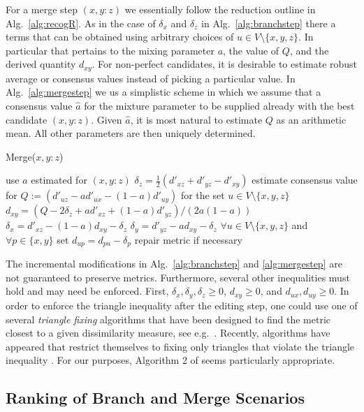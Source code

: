 \documentclass[amsmath]{lni}
\begin{document}
For a merge step $(x,y:z)$ we essentially follow the reduction outline in
Alg.~\ref{alg:recogR}. As in the case of $\delta_x$ and $\delta_z$ in
Alg.~\ref{alg:branchstep} there a terms that can be obtained using
arbitrary choices of $u\in V\setminus\{x,y,z\}$. In particular that
pertains to the mixing parameter $a$, the value of $Q$, and the derived
quantity $d_{xy}$. For non-perfect candidates, it is desirable to estimate
robust average or consensus values instead of picking a particular value.
In Alg.~\ref{alg:mergestep} we us a simplistic scheme in which we assume
that a consensus value $\hat a$ for the mixture parameter to be supplied
already with the best candidate $(x,y:z)$. Given $\hat a$, it is most
natural to estimate $Q$ as an arithmetic mean. All other parameters are
then uniquely determined.

\begin{algorithm}[H]
\caption{Merge($x,y:z$)} 
\label{alg:mergestep} 
\SetAlgoLined
use $a$ estimated for $(x,y:z)$\;
$\delta_z = \frac{1}{2}(d'_{xz}+d'_{yz}-d'_{xy})$\;
estimate consensus value for $Q:=(d'_{uz}-a d'_{ux}-(1-a) d'_{uy})$ for the 
set $u\in V\setminus\{x,y,z\}$\;
$d_{xy} = (Q-2 \delta_z + a d'_{xz}+(1-a) d'_{yz})/(2a(1-a))$\;
$\delta_x = d'_{xz} - (1-a) d_{xy} - \delta_z$\;
$\delta_y = d'_{yz} -   a   d_{xy} - \delta_z$\;
$\forall u\in V\setminus\{x,y,z\}$ and $\forall p\in\{x,y\}$ set   
$d_{up} = d_{pu} -\delta_p$\;
repair metric if necessary\;
\end{algorithm} 

The incremental modifications in Alg.~\ref{alg:branchstep} and
\ref{alg:mergestep} are not guaranteed to preserve metrics. Furthermore,
several other inequalities must hold and may need be enforced. First,
$\delta_x,\delta_y,\delta_z\ge 0$, $d_{xy}\ge 0$, and $d_{ux},d_{uy}\ge
0$. In order to enforce the triangle inequality after the editing step, one
could use one of several \emph{triangle fixing} algorithms that have been
designed to find the metric closest to a given dissimilarity measure, see
e.g.\ \cite{Sra:05,Brickel:08}. Recently, algorithms have appeared that
restrict themselves to fixing only triangles that violate the triangle
inequality \cite{Gilbert:17}. For our purposes, Algorithm 2 of
\cite{Gilbert:17} seems particularly appropriate.

\subsection{Ranking of Branch and Merge Scenarios}
\end{document}
